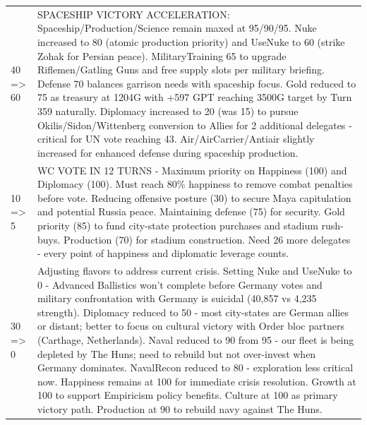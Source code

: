 \begin{longtable}{p{}p{}}
40 => 60 & SPACESHIP VICTORY ACCELERATION: Spaceship/Production/Science remain maxed at 95/90/95. Nuke increased to 80 (atomic production priority) and UseNuke to 60 (strike Zohak for Persian peace). MilitaryTraining 65 to upgrade Riflemen/Gatling Guns and free supply slots per military briefing. Defense 70 balances garrison needs with spaceship focus. Gold reduced to 75 as treasury at 1204G with +597 GPT reaching 3500G target by Turn 359 naturally. Diplomacy increased to 20 (was 15) to pursue Okilis/Sidon/Wittenberg conversion to Allies for 2 additional delegates - critical for UN vote reaching 43. Air/AirCarrier/Antiair slightly increased for enhanced defense during spaceship production. \\
10 => 5 & WC VOTE IN 12 TURNS - Maximum priority on Happiness (100) and Diplomacy (100). Must reach 80\% happiness to remove combat penalties before vote. Reducing offensive posture (30) to secure Maya capitulation and potential Russia peace. Maintaining defense (75) for security. Gold priority (85) to fund city-state protection purchases and stadium rush-buys. Production (70) for stadium construction. Need 26 more delegates - every point of happiness and diplomatic leverage counts. \\
30 => 0 & Adjusting flavors to address current crisis. Setting Nuke and UseNuke to 0 - Advanced Ballistics won't complete before Germany votes and military confrontation with Germany is suicidal (40,857 vs 4,235 strength). Diplomacy reduced to 50 - most city-states are German allies or distant; better to focus on cultural victory with Order bloc partners (Carthage, Netherlands). Naval reduced to 90 from 95 - our fleet is being depleted by The Huns; need to rebuild but not over-invest when Germany dominates. NavalRecon reduced to 80 - exploration less critical now. Happiness remains at 100 for immediate crisis resolution. Growth at 100 to support Empiricism policy benefits. Culture at 100 as primary victory path. Production at 90 to rebuild navy against The Huns. \\

\end{longtable}
